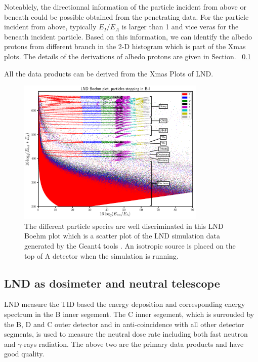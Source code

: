 Noteablely, the directionnal information of the particle incident from above or beneath could be possible obtained from the penetrating data. For the particle incident from above, typically $E_I/E_A$ is larger than 1 and vice veras for the beneath incident particle. 
Based on this information, we can identify the albedo protons from different branch in the 2-D histogram which is part of the Xmas plots.
The details of the derivations of albedo protons are given in Section. ~\ref{}

All the data products can be derived from the Xmas Plots of LND.

\begin{figure}
    \centering
    \includegraphics[width=0.8\textwidth]{images/LND_Boehm_plot_isotropic_on_top_of_A_annotated.png}
    \caption[LND Boehm plot of stopping particles based on the simulated data]{The different particle species are well discriminated in this LND Boehm plot which is a scatter plot of the \ac{LND} simulation data generated by the \ac{Geant4} tools \citet{Agostinelli-2003}. An isotropic source is placed on the top of A detector when the simulation is running.}
    \label{Fig:LND-Boehm-plot}
\end{figure}


\subsection{LND as dosimeter and neutral telescope}

\ac{LND} measure the \ac{TID} based the energy deposition and corresponding energy spectrum in the B inner segement. The C inner segement, which is surrouded by the B, D and C outer detector and in anti-coincidence with
all other detector segments, is used to measure the neutral dose rate including both fast neutron and $\gamma$-rays radiation. The above two are the primary data products and have good quality. 

